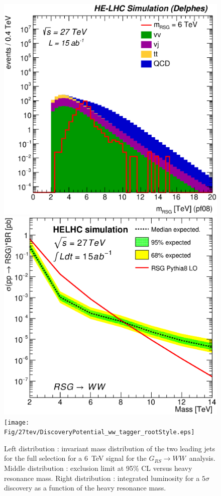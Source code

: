 \documentclass{cernrep}
\newcommand*{\rsg}{\ensuremath{G_{RS} \rightarrow WW}}
\begin{document}
\begin{figure}
  \centering
  \includegraphics[width=0.30\columnwidth]{Fig/27tev/RSGWW_Mj1j2_pf08_fit_sel4_nostack_log.eps}
  \includegraphics[width=0.30\columnwidth]{Fig/27tev/lim_RSGraviton_ww_helhc_v01.eps}
  \texttt{[image: Fig/27tev/DiscoveryPotential\_ww\_tagger\_rootStyle.eps]}
  \caption{Left distribution : invariant mass distribution of the two leading jets for the full selection for a 6~TeV signal for the \rsg\ analysis. Middle distribution : exclusion limit at 95\% CL versus heavy resonance mass. Right distribution : integrated luminosity for a $5\sigma$ discovery as a function of the heavy resonance mass.}
  \label{figure:hadronicresonances27:wwsel04}
\end{figure}

\begin{table}[!htb]\centering
{}
\caption{Final yield of $RSG \rightarrow WW$ analysis.}
\label{tab:RSGwwYield27}
\end{table}
\end{document}
